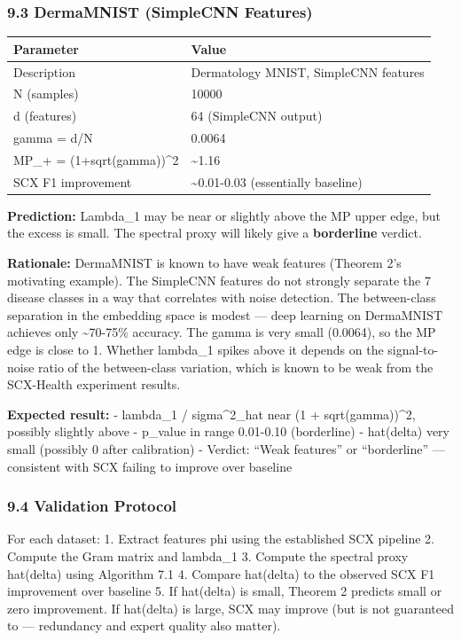 \documentclass[
  12pt,
]{article}
\begin{document}
\subsubsection{9.3 DermaMNIST (SimpleCNN
Features)}\label{dermamnist-simplecnn-features}

\begin{longtable}[]{@{}ll@{}}
\toprule\noalign{}
Parameter & Value \\
\midrule\noalign{}
\endhead
\bottomrule\noalign{}
\endlastfoot
Description & Dermatology MNIST, SimpleCNN features \\
N (samples) & 10000 \\
d (features) & 64 (SimpleCNN output) \\
gamma = d/N & 0.0064 \\
MP\_+ = (1+sqrt(gamma))\^{}2 & \textasciitilde1.16 \\
SCX F1 improvement & \textasciitilde0.01-0.03 (essentially baseline) \\
\end{longtable}

\textbf{Prediction:} Lambda\_1 may be near or slightly above the MP
upper edge, but the excess is small. The spectral proxy will likely give
a \textbf{borderline} verdict.

\textbf{Rationale:} DermaMNIST is known to have weak features (Theorem
2's motivating example). The SimpleCNN features do not strongly separate
the 7 disease classes in a way that correlates with noise detection. The
between-class separation in the embedding space is modest --- deep
learning on DermaMNIST achieves only \textasciitilde70-75\% accuracy.
The gamma is very small (0.0064), so the MP edge is close to 1. Whether
lambda\_1 spikes above it depends on the signal-to-noise ratio of the
between-class variation, which is known to be weak from the SCX-Health
experiment results.

\textbf{Expected result:} - lambda\_1 / sigma\^{}2\_hat near (1 +
sqrt(gamma))\^{}2, possibly slightly above - p\_value in range 0.01-0.10
(borderline) - hat(delta) very small (possibly 0 after calibration) -
Verdict: ``Weak features'' or ``borderline'' --- consistent with SCX
failing to improve over baseline

\subsubsection{9.4 Validation Protocol}\label{validation-protocol}

For each dataset: 1. Extract features phi using the established SCX
pipeline 2. Compute the Gram matrix and lambda\_1 3. Compute the
spectral proxy hat(delta) using Algorithm 7.1 4. Compare hat(delta) to
the observed SCX F1 improvement over baseline 5. If hat(delta) is small,
Theorem 2 predicts small or zero improvement. If hat(delta) is large,
SCX may improve (but is not guaranteed to --- redundancy and expert
quality also matter).
\end{document}
